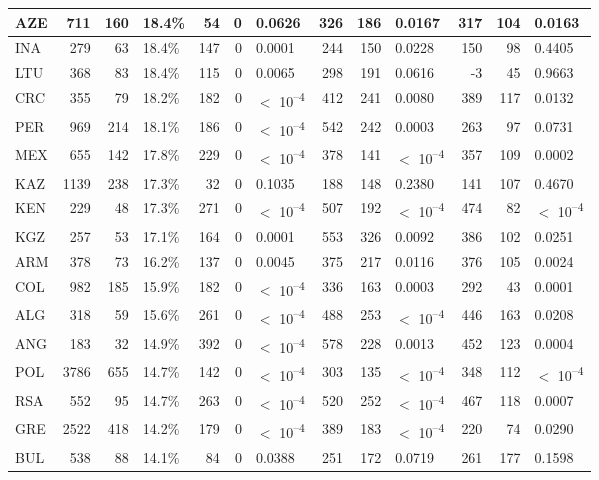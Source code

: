 \begin{tabular}{l|r|r|l|r|r|l|r|r|l|r|r|l}
\hline
AZE & 711 & 160 & 18.4\% & 54 & 0 & 0.0626 & 326 & 186 & 0.0167 & 317 & 104 & 0.0163\\
\hline
INA & 279 & 63 & 18.4\% & 147 & 0 & 0.0001 & 244 & 150 & 0.0228 & 150 & 98 & 0.4405\\
\hline
LTU & 368 & 83 & 18.4\% & 115 & 0 & 0.0065 & 298 & 191 & 0.0616 & -3 & 45 & 0.9663\\
\hline
CRC & 355 & 79 & 18.2\% & 182 & 0 & $<$ 10\textsuperscript{--4} & 412 & 241 & 0.0080 & 389 & 117 & 0.0132\\
\hline
PER & 969 & 214 & 18.1\% & 186 & 0 & $<$ 10\textsuperscript{--4} & 542 & 242 & 0.0003 & 263 & 97 & 0.0731\\
\hline
MEX & 655 & 142 & 17.8\% & 229 & 0 & $<$ 10\textsuperscript{--4} & 378 & 141 & $<$ 10\textsuperscript{--4} & 357 & 109 & 0.0002\\
\hline
KAZ & 1139 & 238 & 17.3\% & 32 & 0 & 0.1035 & 188 & 148 & 0.2380 & 141 & 107 & 0.4670\\
\hline
KEN & 229 & 48 & 17.3\% & 271 & 0 & $<$ 10\textsuperscript{--4} & 507 & 192 & $<$ 10\textsuperscript{--4} & 474 & 82 & $<$ 10\textsuperscript{--4}\\
\hline
KGZ & 257 & 53 & 17.1\% & 164 & 0 & 0.0001 & 553 & 326 & 0.0092 & 386 & 102 & 0.0251\\
\hline
ARM & 378 & 73 & 16.2\% & 137 & 0 & 0.0045 & 375 & 217 & 0.0116 & 376 & 105 & 0.0024\\
\hline
COL & 982 & 185 & 15.9\% & 182 & 0 & $<$ 10\textsuperscript{--4} & 336 & 163 & 0.0003 & 292 & 43 & 0.0001\\
\hline
ALG & 318 & 59 & 15.6\% & 261 & 0 & $<$ 10\textsuperscript{--4} & 488 & 253 & $<$ 10\textsuperscript{--4} & 446 & 163 & 0.0208\\
\hline
ANG & 183 & 32 & 14.9\% & 392 & 0 & $<$ 10\textsuperscript{--4} & 578 & 228 & 0.0013 & 452 & 123 & 0.0004\\
\hline
POL & 3786 & 655 & 14.7\% & 142 & 0 & $<$ 10\textsuperscript{--4} & 303 & 135 & $<$ 10\textsuperscript{--4} & 348 & 112 & $<$ 10\textsuperscript{--4}\\
\hline
RSA & 552 & 95 & 14.7\% & 263 & 0 & $<$ 10\textsuperscript{--4} & 520 & 252 & $<$ 10\textsuperscript{--4} & 467 & 118 & 0.0007\\
\hline
GRE & 2522 & 418 & 14.2\% & 179 & 0 & $<$ 10\textsuperscript{--4} & 389 & 183 & $<$ 10\textsuperscript{--4} & 220 & 74 & 0.0290\\
\hline
BUL & 538 & 88 & 14.1\% & 84 & 0 & 0.0388 & 251 & 172 & 0.0719 & 261 & 177 & 0.1598\\

\end{tabular}
